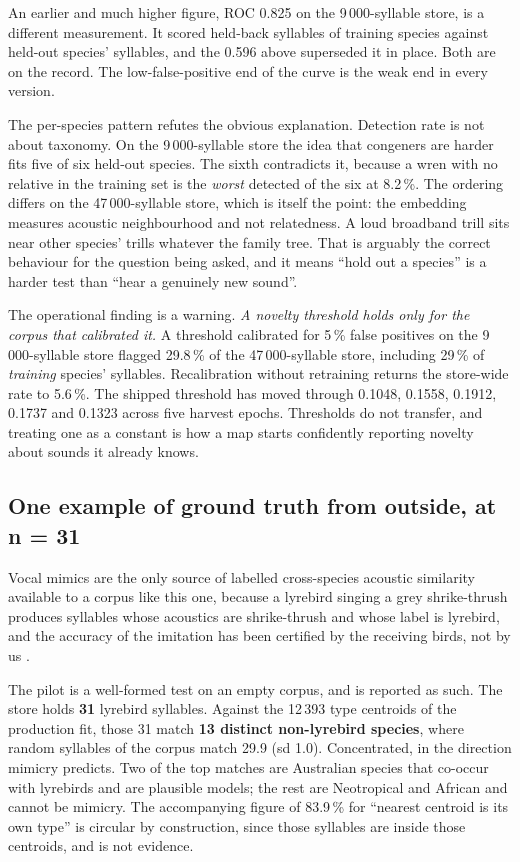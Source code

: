 \documentclass[10pt,twocolumn,a4paper]{article}
\begin{document}
An earlier and much higher figure, ROC 0.825 on the 9\,000-syllable store, is a different
measurement. It scored held-back syllables of training species against held-out species'
syllables, and the 0.596 above superseded it in place. Both are on the record. The low-false-positive
end of the curve is the weak end in every version.

The per-species pattern refutes the obvious explanation. Detection rate is not about taxonomy.
On the 9\,000-syllable store the idea that congeners are harder fits five of six held-out
species. The sixth contradicts it, because a wren with no relative in the training set is the
\emph{worst} detected of the six at 8.2\,\%. The ordering differs on the 47\,000-syllable store,
which is itself the point: the embedding measures acoustic neighbourhood and not relatedness. A
loud broadband trill sits near other species' trills whatever the family tree. That is
arguably the correct behaviour for the question being asked, and it means ``hold out a
species'' is a harder test than ``hear a genuinely new sound''.

The operational finding is a warning. \emph{A novelty threshold holds only for the corpus that
calibrated it.} A threshold calibrated for 5\,\% false positives on the 9\,000-syllable store
flagged 29.8\,\% of the 47\,000-syllable store, including 29\,\% of \emph{training} species'
syllables. Recalibration without retraining returns the store-wide rate to 5.6\,\%. The
shipped threshold has moved through 0.1048, 0.1558, 0.1912, 0.1737 and 0.1323 across five
harvest epochs. Thresholds do not transfer, and treating one as a constant is how a map starts
confidently reporting novelty about sounds it already knows.

\subsection{One example of ground truth from outside, at n = 31}

Vocal mimics are the only source of labelled cross-species acoustic similarity available to a
corpus like this one, because a lyrebird singing a grey shrike-thrush produces syllables whose
acoustics are shrike-thrush and whose label is lyrebird, and the accuracy of the imitation
has been certified by the receiving birds, not by us \citep{dalziell2012}.

The pilot is a well-formed test on an empty corpus, and is reported as such. The store holds
\textbf{31} lyrebird syllables. Against the 12\,393 type centroids of the production fit,
those 31 match \textbf{13 distinct non-lyrebird species}, where random syllables of the corpus
match 29.9 (sd 1.0). Concentrated, in the direction mimicry predicts. Two of the top
matches are Australian species that co-occur with lyrebirds and are plausible models; the rest
are Neotropical and African and cannot be mimicry. The accompanying figure of 83.9\,\% for
``nearest centroid is its own type'' is circular by construction, since those syllables are
inside those centroids, and is not evidence.
\end{document}

